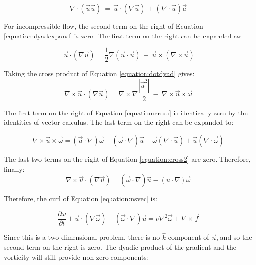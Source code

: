 \documentclass[journal]{new-aiaa}
\begin{document}
\begin{equation}
\label{equation:dyadexpand}
\nabla \cdot (\vec{u} \vec{u} )\  =\  \vec{u} \cdot (\nabla \vec{u} )\  +(\nabla \cdot \vec{u} )\vec{u} 
\end{equation}

For incompressible flow, the second term on the right of Equation \ref{equation:dyadexpand} is zero. The first term on the right can be expanded as:

\begin{equation}
\label{equation:dotdyad}\
\vec{u} \cdot (\nabla \vec{u} )=\frac{1}{2} \nabla (\vec{u} \cdot \vec{u} )\  -\  \vec{u} \times (\nabla \times \vec{u} )
\end{equation}

Taking the cross product of Equation \ref{equation:dotdyad} gives:
\begin{equation}
\label{equation:cross}
\nabla \times \vec{u} \cdot (\nabla \vec{u} )=\nabla \times \nabla \frac{\left| \vec{u}^{2} \right|  }{2} \  -\  \nabla \times \vec{u} \times \vec{\omega } 
\end{equation}

The first term on the right of Equation \ref{equation:cross} is identically zero by the identities of vector calculus. The last term on the right can be expanded to:

\begin{equation}
\label{equation:cross2}
\nabla \times \vec{u} \times \vec{\omega } =(\vec{u} \cdot \nabla )\vec{\omega } -(\vec{\omega } \cdot \nabla )\vec{u} +\vec{\omega } (\nabla \cdot \vec{u} )+\vec{u} (\nabla \cdot \vec{\omega } )
\end{equation}

The last two terms on the right of Equation \ref{equation:cross2} are zero. Therefore, finally:
\begin{equation}
\label{equation:cross3}
\nabla \times \vec{u} \cdot (\nabla \vec{u} )=(\vec{\omega } \cdot \nabla )\vec{u} -(u\cdot \nabla )\vec{\omega } 
\end{equation}

Therefore, the curl of Equation \ref{equation:nsvec} is:

\begin{equation}
\label{equation:vorticity}
\frac{\partial \omega }{\partial t} +\vec{u} \cdot (\nabla \vec{\omega } )-(\vec{\omega } \cdot \nabla )\vec{u} =\nu \nabla^{2} \vec{\omega } +\nabla \times \vec{f} 
\end{equation}

Since this is a two-dimensional problem, there is no $\hat{k}$ component of $\vec{u}$,  and so the second term on the right is zero. The dyadic product of the gradient and the vorticity will still provide non-zero components:
\end{document}
